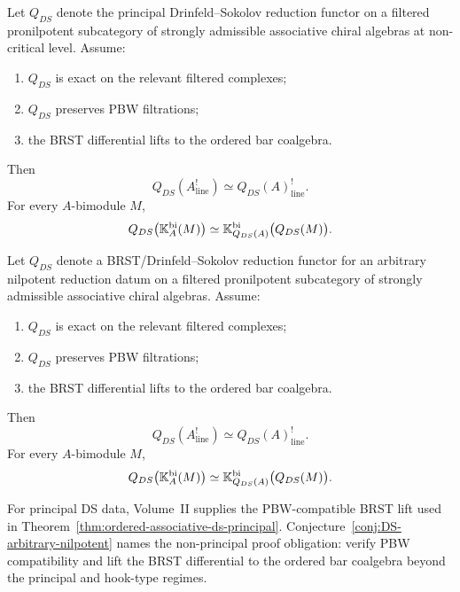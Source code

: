 \begin{theorem}
\label{thm:ordered-associative-ds-principal}
Let $Q_{DS}$ denote the principal Drinfeld--Sokolov reduction functor on a filtered pronilpotent
subcategory of strongly admissible associative chiral algebras at non-critical level. Assume:
\begin{enumerate}[label=(\alph*)]
\item $Q_{DS}$ is exact on the relevant filtered complexes;
\item $Q_{DS}$ preserves PBW filtrations;
\item the BRST differential lifts to the ordered bar coalgebra.
\end{enumerate}
Then
\[
Q_{DS}(A^!_{\mathrm{line}})\simeq Q_{DS}(A)^!_{\mathrm{line}}.
\]
For every $A$-bimodule $M$,
\[
Q_{DS}\bigl(\mathbb{K}_A^{\mathrm{bi}}(M)\bigr)\simeq
\mathbb{K}_{Q_{DS}(A)}^{\mathrm{bi}}\bigl(Q_{DS}(M)\bigr).
\]
\end{theorem}

\begin{conjecture}
\ClaimStatusConjectured
\label{conj:DS-arbitrary-nilpotent}
Let $Q_{DS}$ denote a BRST/Drinfeld--Sokolov reduction functor for an arbitrary nilpotent
reduction datum on a filtered pronilpotent subcategory of strongly admissible associative chiral
algebras. Assume:
\begin{enumerate}[label=(\alph*)]
\item $Q_{DS}$ is exact on the relevant filtered complexes;
\item $Q_{DS}$ preserves PBW filtrations;
\item the BRST differential lifts to the ordered bar coalgebra.
\end{enumerate}
Then
\[
Q_{DS}(A^!_{\mathrm{line}})\simeq Q_{DS}(A)^!_{\mathrm{line}}.
\]
For every $A$-bimodule $M$,
\[
Q_{DS}\bigl(\mathbb{K}_A^{\mathrm{bi}}(M)\bigr)\simeq
\mathbb{K}_{Q_{DS}(A)}^{\mathrm{bi}}\bigl(Q_{DS}(M)\bigr).
\]
\end{conjecture}

\begin{remark}
For principal DS data, Volume~II supplies the PBW-compatible BRST lift
used in Theorem~\ref{thm:ordered-associative-ds-principal}.
Conjecture~\ref{conj:DS-arbitrary-nilpotent} names the non-principal
proof obligation: verify PBW compatibility and lift the BRST
differential to the ordered bar coalgebra beyond the principal and
hook-type regimes.
\end{remark}

